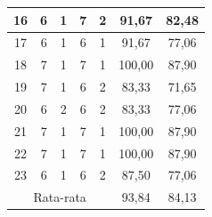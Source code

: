 \begin{table}[H]
\begin{tabular}{|ccccc|c|c|}
		\multicolumn{1}{|c|}{16}                                & \multicolumn{1}{c|}{6}                               & \multicolumn{1}{c|}{1}                               & \multicolumn{1}{c|}{7}                               & 2       & 91,67     & 82,48          \\ \hline
		\multicolumn{1}{|c|}{17}                                & \multicolumn{1}{c|}{6}                               & \multicolumn{1}{c|}{1}                               & \multicolumn{1}{c|}{6}                               & 1       & 91,67     & 77,06          \\ \hline
		\multicolumn{1}{|c|}{18}                                & \multicolumn{1}{c|}{7}                               & \multicolumn{1}{c|}{1}                               & \multicolumn{1}{c|}{7}                               & 1       & 100,00    & 87,90          \\ \hline
		\multicolumn{1}{|c|}{19}                                & \multicolumn{1}{c|}{7}                               & \multicolumn{1}{c|}{1}                               & \multicolumn{1}{c|}{6}                               & 2       & 83,33     & 71,65          \\ \hline
		\multicolumn{1}{|c|}{20}                                & \multicolumn{1}{c|}{6}                               & \multicolumn{1}{c|}{2}                               & \multicolumn{1}{c|}{6}                               & 2       & 83,33     & 77,06          \\ \hline
		\multicolumn{1}{|c|}{21}                                & \multicolumn{1}{c|}{7}                               & \multicolumn{1}{c|}{1}                               & \multicolumn{1}{c|}{7}                               & 1       & 100,00    & 87,90          \\ \hline
		\multicolumn{1}{|c|}{22}                                & \multicolumn{1}{c|}{7}                               & \multicolumn{1}{c|}{1}                               & \multicolumn{1}{c|}{7}                               & 1       & 100,00    & 87,90          \\ \hline
		\multicolumn{1}{|c|}{23}                                & \multicolumn{1}{c|}{6}                               & \multicolumn{1}{c|}{1}                               & \multicolumn{1}{c|}{6}                               & 2       & 87,50     & 77,06          \\ \hline
		\multicolumn{5}{|c|}{Rata-rata}                         & 93,84                                                & 84,13                                                                                                                                              \\ \hline
	\end{tabular}
\end{table}

